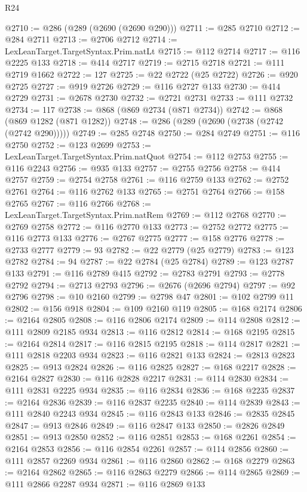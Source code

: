 \begin{lexlean}{R24}
\begin{coremodule}
@2710 := @286 (@289 (@2690 (@2690 @290)))
@2711 := @285 @2710
@2712 := @284 @2711
@2713 := @2706 @2712
@2714 := LexLeanTarget.TargetSyntax.Prim.natLt
@2715 := @112 @2714
@2717 := @116 @2225 @133
@2718 := @414 @2717
@2719 := @2715 @2718
@2721 := @111 @2719 @1662
@2722 := 127
@2725 := @22 @2722 (@25 @2722)
@2726 := @920 @2725
@2727 := @919 @2726
@2729 := @116 @2727 @133
@2730 := @414 @2729
@2731 := @2678 @2730
@2732 := @2721 @2731
@2733 := @111 @2732
@2734 := 117
@2738 := @868 (@869 @2734 (@871 @2734))
@2742 := @868 (@869 @1282 (@871 @1282))
@2748 := @286 (@289 (@2690 (@2738 (@2742 (@2742 @290)))))
@2749 := @285 @2748
@2750 := @284 @2749
@2751 := @116 @2750
@2752 := @123 @2699
@2753 := LexLeanTarget.TargetSyntax.Prim.natQuot
@2754 := @112 @2753
@2755 := @116 @2243
@2756 := @935 @133
@2757 := @2755 @2756
@2758 := @414 @2757
@2759 := @2754 @2758
@2761 := @116 @2759 @133
@2762 := @2752 @2761
@2764 := @116 @2762 @133
@2765 := @2751 @2764
@2766 := @158 @2765
@2767 := @116 @2766
@2768 := LexLeanTarget.TargetSyntax.Prim.natRem
@2769 := @112 @2768
@2770 := @2769 @2758
@2772 := @116 @2770 @133
@2773 := @2752 @2772
@2775 := @116 @2773 @133
@2776 := @2767 @2775
@2777 := @158 @2776
@2778 := @2733 @2777
@2779 := 93
@2782 := @22 @2779 (@25 @2779)
@2783 := @123 @2782
@2784 := 94
@2787 := @22 @2784 (@25 @2784)
@2789 := @123 @2787 @133
@2791 := @116 @2789 @415
@2792 := @2783 @2791
@2793 := @2778 @2792
@2794 := @2713 @2793
@2796 := @2676 (@2696 @2794)
@2797 := @92 @2796
@2798 := @10 @2160
@2799 := @2798 @47
@2801 := @102 @2799 @11
@2802 := @156 @918
@2804 := @109 @2160 @119
@2805 := @168 @2174
@2806 := @2164 @2805
@2808 := @116 @2806 @2174
@2809 := @114 @2808
@2812 := @111 @2809 @2185 @934
@2813 := @116 @2812
@2814 := @168 @2195
@2815 := @2164 @2814
@2817 := @116 @2815 @2195
@2818 := @114 @2817
@2821 := @111 @2818 @2203 @934
@2823 := @116 @2821 @133
@2824 := @2813 @2823
@2825 := @913 @2824
@2826 := @116 @2825
@2827 := @168 @2217
@2828 := @2164 @2827
@2830 := @116 @2828 @2217
@2831 := @114 @2830
@2834 := @111 @2831 @2225 @934
@2835 := @116 @2834
@2836 := @168 @2235
@2837 := @2164 @2836
@2839 := @116 @2837 @2235
@2840 := @114 @2839
@2843 := @111 @2840 @2243 @934
@2845 := @116 @2843 @133
@2846 := @2835 @2845
@2847 := @913 @2846
@2849 := @116 @2847 @133
@2850 := @2826 @2849
@2851 := @913 @2850
@2852 := @116 @2851
@2853 := @168 @2261
@2854 := @2164 @2853
@2856 := @116 @2854 @2261
@2857 := @114 @2856
@2860 := @111 @2857 @2269 @934
@2861 := @116 @2860
@2862 := @168 @2279
@2863 := @2164 @2862
@2865 := @116 @2863 @2279
@2866 := @114 @2865
@2869 := @111 @2866 @2287 @934
@2871 := @116 @2869 @133

\end{coremodule}
\end{lexlean}
